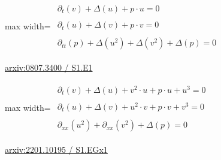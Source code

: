 \documentclass[UTF8,10pt,a4paper,fontset=mac]{ctexart}
\begin{document}
\begin{minipage}{\linewidth}\begin{center}\begin{adjustbox}{max width=\linewidth}$\displaystyle\begin{gathered}\begin{gathered}\partial_{t}(v)+\Delta(u)+p\cdot u=0\end{gathered}\\[5pt]\begin{gathered}\partial_{t}(u)+\Delta(v)+p\cdot v=0\end{gathered}\\[5pt]\begin{gathered}\partial_{tt}(p)+\Delta(u^{2})+\Delta(v^{2})+\Delta(p)=0\end{gathered}\end{gathered}$\end{adjustbox}\end{center}{\small\href{https://arxiv.org/html/0807.3400#S1.E1}{arxiv:0807.3400 / S1.E1}}\par\end{minipage}\par\vspace{6mm}

\begin{minipage}{\linewidth}\begin{center}\begin{adjustbox}{max width=\linewidth}$\displaystyle\begin{gathered}\begin{gathered}\partial_{t}(v)+\Delta(u)+v^{2}\cdot u+p\cdot u+u^{3}=0\end{gathered}\\[5pt]\begin{gathered}\partial_{t}(u)+\Delta(v)+u^{2}\cdot v+p\cdot v+v^{3}=0\end{gathered}\\[5pt]\begin{gathered}\partial_{xx}(u^{2})+\partial_{xx}(v^{2})+\Delta(p)=0\end{gathered}\end{gathered}$\end{adjustbox}\end{center}{\small\href{https://arxiv.org/html/2201.10195#S1.EGx1}{arxiv:2201.10195 / S1.EGx1}}\par\end{minipage}\par\vspace{6mm}
\end{document}
